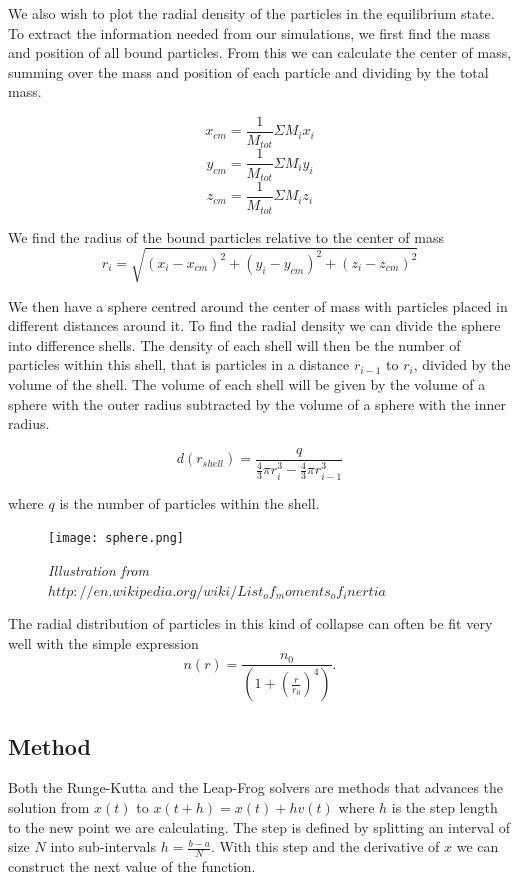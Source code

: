 \documentclass[a4paper,12pt, english]{article}
\begin{document}
We also wish to plot the radial density of the particles in the equilibrium state. To extract the information needed from our simulations, we first find the mass and position of all bound particles. From this we can calculate the center of mass, summing over the mass and position of each particle and dividing by the total mass.


$$        x_{cm} = \frac{1}{M_{tot}} \Sigma M_i x_i $$
$$        y_{cm} = \frac{1}{M_{tot}} \Sigma M_i y_i $$
$$        z_{cm} = \frac{1}{M_{tot}} \Sigma M_i z_i $$

We find the radius of the bound particles relative to the center of mass
\[
r_i = \sqrt{(x_i - x_{cm})^2 + (y_i - y_{cm})^2 + (z_i - z_{cm})^2 }
\]

We then have a sphere centred around the center of mass with particles placed in different distances around it. To find the radial density we can divide the sphere into difference shells. The density of each shell will then be the number of particles within this shell, that is particles in a distance $r_{i-1}$ to $r_i$, divided by the volume of the shell. The volume of each shell will be given by the volume of a sphere with the outer radius subtracted by the volume of a sphere with the inner radius.

\[
d(r_{shell}) = \frac{q}{ \frac{4}{3} \pi r_i^3 - \frac{4}{3} \pi r_{i-1}^3}
\]
 
where $q$ is the number of particles within the shell.

\begin{figure}
        \texttt{[image: sphere.png]}
        \caption{\textit{Illustration from $ http://en.wikipedia.org/wiki/List_of_moments_of_inertia$}}
        \label{fig:sphere}
\end{figure}
        

The radial distribution of particles in this kind of collapse can often be fit very well with the simple expression
\[
n(r) = \frac{n_0}{\left(1 +\left(\frac{r}{r_0}\right)^4\right)}.
\]

 
\subsection*{Method}

Both the Runge-Kutta and the Leap-Frog solvers are methods that advances the solution from $x(t)$ to $x(t+h) = x(t) + hv(t)$ where $h$ is the step length to the new point we are calculating. The step is defined by splitting an interval of size $N$ into sub-intervals $h = \frac{b-a}{N}$. With this step and the derivative of $x$ we can construct the next value of the function.
\end{document}
